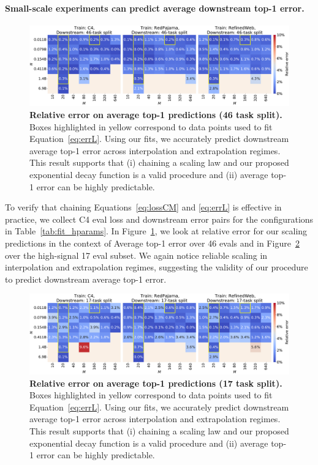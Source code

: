 \begin{appendix}
\paragraph{Small-scale experiments can predict average downstream top-1 error.}
\begin{figure}[tp]
    \centering
    \includegraphics[width=\linewidth]{figs/error_downstream_all.pdf}
    \caption{\textbf{Relative error on average top-1 predictions (46 task split).}
    Boxes highlighted in yellow correspond to data points used to fit Equation~\eqref{eq:errL}.
    Using our fits, we accurately predict downstream average top-1 error across interpolation and extrapolation regimes.
    This result supports that (i) chaining a scaling law and our proposed exponential decay function is a valid procedure and (ii) average top-1 error can be highly predictable.
    }
    \label{fig:error_downstream_all}
\end{figure}
To verify that chaining Equations~\eqref{eq:lossCM} and \eqref{eq:errL} is effective in practice, we collect C4 eval loss and downstream error pairs for the configurations in Table~\ref{tab:fit_hparams}.
In Figure~\ref{fig:error_downstream_all}, we look at relative error for our scaling predictions in the context of Average top-1 error over 46 evals and in Figure~\ref{fig:error_downstream_subset} over the high-signal 17 eval subset.
We again notice reliable scaling in interpolation and extrapolation regimes, suggesting the validity of our procedure to predict downstream average top-1 error.


\begin{figure}[tp]
    \centering
    \includegraphics[width=\linewidth]{figs/error_downstream_subset.pdf}
    \caption{\textbf{Relative error on average top-1 predictions (17 task split).}
    Boxes highlighted in yellow correspond to data points used to fit Equation~\eqref{eq:errL}.
    Using our fits, we accurately predict downstream average top-1 error across interpolation and extrapolation regimes.
    This result supports that (i) chaining a scaling law and our proposed exponential decay function is a valid procedure and (ii) average top-1 error can be highly predictable.
    }
    \label{fig:error_downstream_subset}
\end{figure}


\end{appendix}
